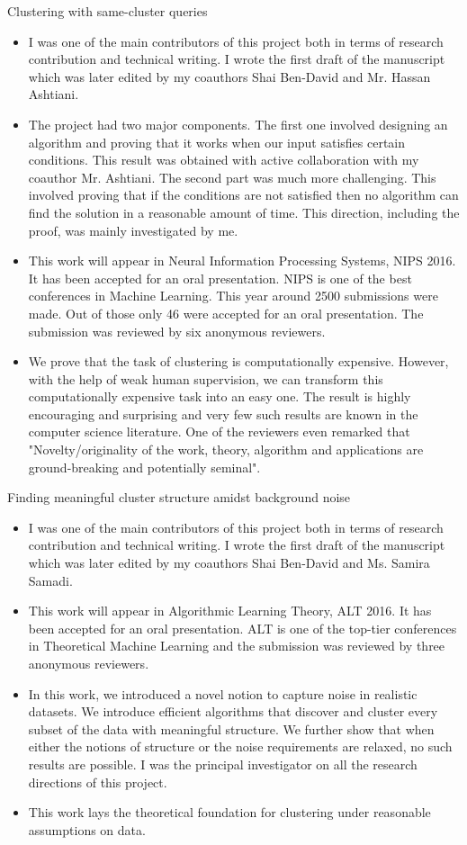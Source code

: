 \documentclass[12pt]{article}
\begin{document}
\noindent Clustering with same-cluster queries
\begin{itemize}[nolistsep]
\item I was one of the main contributors of this project both in terms of research contribution and technical writing. I wrote the first draft of the manuscript which was later edited by my coauthors Shai Ben-David and Mr. Hassan Ashtiani. 
\item The project had two major components. The first one involved designing an algorithm and proving that it works when our input satisfies certain conditions. This result was obtained with active collaboration with my coauthor Mr. Ashtiani. The second part was much more challenging. This involved proving that if the conditions are not satisfied then no algorithm can find the solution in a reasonable amount of time. This direction, including the proof, was mainly investigated by me.
\item This work will appear in Neural Information Processing Systems, NIPS 2016. It has been accepted for an oral presentation. NIPS is one of the best conferences in Machine Learning. This year around 2500 submissions were made. Out of those only 46 were accepted for an oral presentation. The submission was reviewed by six anonymous reviewers.
\item We prove that the task of clustering is computationally expensive. However, with the help of weak human supervision, we can transform this computationally expensive task into an easy one. The result is highly encouraging and surprising and very few such results are known in the computer science literature. One of the reviewers even remarked that "Novelty/originality of the work, theory, algorithm and applications are ground-breaking and potentially seminal". 
\end{itemize}

\vspace{0.15in}\noindent Finding meaningful cluster structure amidst background noise
\begin{itemize}[nolistsep]
\item I was one of the main contributors of this project both in terms of research contribution and technical writing. I wrote the first draft of the manuscript which was later edited by my coauthors Shai Ben-David and Ms. Samira Samadi. 
\item This work will appear in Algorithmic Learning Theory, ALT 2016. It has been accepted for an oral presentation. ALT is one of the top-tier conferences in Theoretical Machine Learning and the submission was reviewed by three anonymous reviewers.
\item In this work, we introduced a novel notion to capture noise in realistic datasets. We introduce efficient algorithms that discover and cluster every subset of the data with meaningful structure. We further show that when either the notions of structure or the noise requirements are relaxed, no such results are possible. I was the principal investigator on all the research directions of this project. 
\item This work lays the theoretical foundation for clustering under reasonable assumptions on data. 
\end{itemize}
\end{document}
